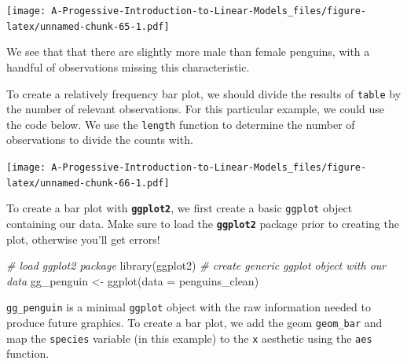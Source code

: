 \documentclass[
]{book}
\newenvironment{Shaded}{\begin{snugshade}}{\end{snugshade}}
\newcommand{\AttributeTok}[1]{\textcolor[rgb]{0.77,0.63,0.00}{#1}}
\newcommand{\CommentTok}[1]{\textcolor[rgb]{0.56,0.35,0.01}{\textit{#1}}}
\newcommand{\FunctionTok}[1]{\textcolor[rgb]{0.00,0.00,0.00}{#1}}
\newcommand{\NormalTok}[1]{#1}
\newcommand{\OtherTok}[1]{\textcolor[rgb]{0.56,0.35,0.01}{#1}}
\newcommand{\SpecialCharTok}[1]{\textcolor[rgb]{0.00,0.00,0.00}{#1}}
\newcommand{\StringTok}[1]{\textcolor[rgb]{0.31,0.60,0.02}{#1}}
\theoremstyle{definition}
\theoremstyle{definition}
\theoremstyle{definition}
\theoremstyle{definition}
\theoremstyle{remark}
\begin{document}
\texttt{[image: A-Progessive-Introduction-to-Linear-Models\_files/figure-latex/unnamed-chunk-65-1.pdf]}

We see that that there are slightly more male than female penguins, with a handful of observations missing this characteristic.

To create a relatively frequency bar plot, we should divide the results of \texttt{table} by the number of relevant observations. For this particular example, we could use the code below. We use the \texttt{length} function to determine the number of observations to divide the counts with.

\begin{Shaded}
\end{Shaded}

\texttt{[image: A-Progessive-Introduction-to-Linear-Models\_files/figure-latex/unnamed-chunk-66-1.pdf]}

To create a bar plot with \textbf{\texttt{ggplot2}}, we first create a basic \texttt{ggplot} object containing our data. Make sure to load the \textbf{\texttt{ggplot2}} package prior to creating the plot, otherwise you'll get errors!

\begin{Shaded}
\begin{Highlighting}[]
\CommentTok{\# load ggplot2 package}
\FunctionTok{library}\NormalTok{(ggplot2)}
\CommentTok{\# create generic ggplot object with our data}
\NormalTok{gg\_penguin }\OtherTok{\textless{}{-}} \FunctionTok{ggplot}\NormalTok{(}\AttributeTok{data =}\NormalTok{ penguins\_clean)}
\end{Highlighting}
\end{Shaded}

\texttt{gg\_penguin} is a minimal \texttt{ggplot} object with the raw information needed to produce future graphics. To create a bar plot, we add the geom \texttt{geom\_bar} and map the \texttt{species} variable (in this example) to the \texttt{x} aesthetic using the \texttt{aes} function.
\end{document}

